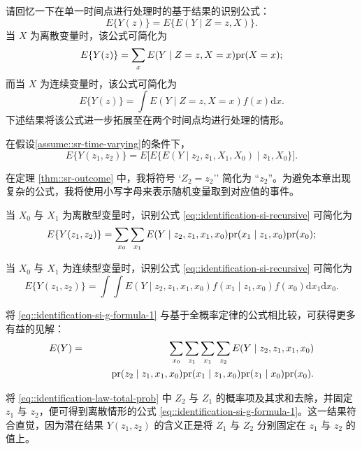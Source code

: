 请回忆一下在单一时间点进行处理时的基于结果的识别公式：
$$
E\{  Y(z) \}  = E\{  E(Y\mid Z=z, X) \} .
$$
当 $X$ 为离散变量时，该公式可简化为
$$
E\{  Y(z) \}  = \sum_x E(Y\mid Z=z, X=x) \textup{pr}(X=x) ;
$$
而当 $X$ 为连续变量时，该公式可简化为
$$
E\{  Y(z) \}  =  \int E(Y\mid Z=z, X=x) f (x) \text{d} x.
$$
下述结果将该公式进一步拓展至在两个时间点均进行处理的情形。 
 
 
 
 \begin{theorem}
\label{thm::sr-outcome}
在假设\ref{assume::sr-time-varying}的条件下，  
\begin{equation}\label{eq::identification-si-recursive}
E\{ Y(z_1, z_2) \} 
=  E\Big [   E\{    E(Y\mid  z_2, z_1, X_1, X_0)  \mid z_1, X_0 \}  \Big ].
\end{equation}
\end{theorem}


在定理 \ref{thm::sr-outcome} 中，我将符号 `$Z_2=z_2$'' 简化为 ``$z_2$''。为避免本章出现复杂的公式，我将使用小写字母来表示随机变量取到对应值的事件。

当 $X_0$ 与 $X_1$ 为离散型变量时，识别公式 \eqref{eq::identification-si-recursive} 可简化为
\begin{equation}\label{eq::identification-si-g-formula-1}
E\{ Y(z_1, z_2) \}  = \sum_{x_0} \sum_{x_1} E( Y \mid  z_2, z_1, x_1,  x_0) \textup{pr}(x_1\mid    z_1, x_0) \textup{pr}(x_0);
\end{equation}

当 $X_0$ 与 $X_1$ 为连续型变量时，识别公式 \eqref{eq::identification-si-recursive} 可简化为
\begin{equation}\label{eq::identification-si-g-formula-2}
E\{ Y(z_1, z_2) \}  =  \int \int E( Y \mid  z_2,  z_1, x_1,  x_0) f(x_1\mid    z_1, x_0) f(x_0) \text{d}x_1 \text{d}x_0.
\end{equation}

将 \eqref{eq::identification-si-g-formula-1} 与基于全概率定律的公式相比较，可获得更多有益的见解：
\begin{eqnarray}
E(Y)  &=& \sum_{x_0} \sum_{z_1} \sum_{x_1} \sum_{z_2} E( Y \mid  z_2, z_1, x_1,  x_0)  \nonumber   \\
&& \qquad   \textup{pr}(z_2 \mid  z_1, x_1,  x_0)
\textup{pr}(x_1\mid    z_1, x_0)  \textup{pr}(z_1\mid x_0)  \textup{pr}(x_0). \label{eq::identification-law-total-prob}
\end{eqnarray}

将 \eqref{eq::identification-law-total-prob} 中 $Z_2$ 与 $Z_1$ 的概率项及其求和去除，并固定 $z_1$ 与 $z_2$，便可得到离散情形的公式 \eqref{eq::identification-si-g-formula-1}。这一结果符合直觉，因为潜在结果 $Y(z_1, z_2)$ 的含义正是将 $Z_1$ 与 $Z_2$ 分别固定在 $z_1$ 与 $z_2$ 的值上。



